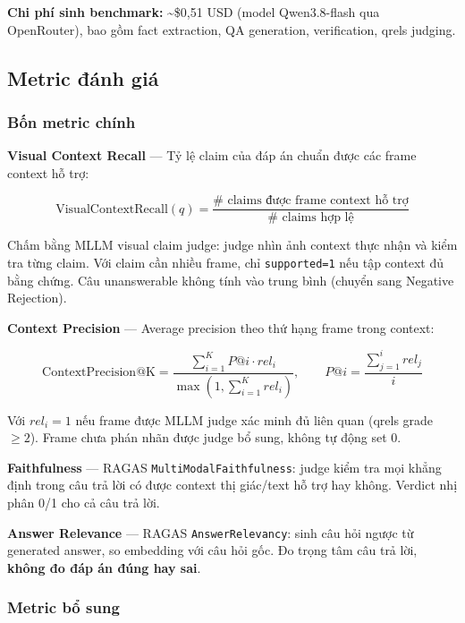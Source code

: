 \documentclass[12pt,a4paper,onecolumn]{article}
\begin{document}
\textbf{Chi phí sinh benchmark:} \textasciitilde{}\$0,51 USD (model Qwen3.8-flash qua OpenRouter), bao gồm fact extraction, QA generation, verification, qrels judging.

\subsection{Metric đánh giá}

\subsubsection{Bốn metric chính}

\textbf{Visual Context Recall} — Tỷ lệ claim của đáp án chuẩn được các frame context hỗ trợ:

$$\mathrm{VisualContextRecall}(q) = \frac{\# \text{ claims được frame context hỗ trợ}}{\# \text{ claims hợp lệ}}$$

Chấm bằng MLLM visual claim judge: judge nhìn ảnh context thực nhận và kiểm tra từng claim. Với claim cần nhiều frame, chỉ \texttt{supported=1} nếu tập context đủ bằng chứng. Câu unanswerable không tính vào trung bình (chuyển sang Negative Rejection).

\textbf{Context Precision} — Average precision theo thứ hạng frame trong context:

$$\mathrm{ContextPrecision@K} = \frac{\sum_{i=1}^{K} P@i \cdot rel_i}{\max(1, \sum_{i=1}^{K} rel_i)}, \qquad P@i = \frac{\sum_{j=1}^{i} rel_j}{i}$$

Với $rel_i = 1$ nếu frame được MLLM judge xác minh đủ liên quan (qrels grade $\geq 2$). Frame chưa phán nhãn được judge bổ sung, không tự động set 0.

\textbf{Faithfulness} — RAGAS \texttt{MultiModalFaithfulness}: judge kiểm tra mọi khẳng định trong câu trả lời có được context thị giác/text hỗ trợ hay không. Verdict nhị phân 0/1 cho cả câu trả lời.

\textbf{Answer Relevance} — RAGAS \texttt{AnswerRelevancy}: sinh câu hỏi ngược từ generated answer, so embedding với câu hỏi gốc. Đo trọng tâm câu trả lời, \textbf{không đo đáp án đúng hay sai}.

\subsubsection{Metric bổ sung}
\end{document}

